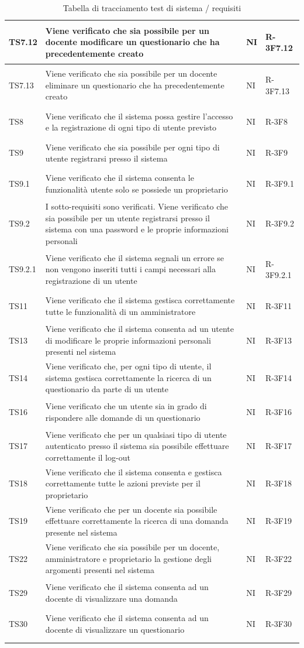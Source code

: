 \documentclass[12pt,a4paper]{article}
\begin{document}
\begin{longtable}{l p{6cm} l l}
		\midrule
		TS7.12 & Viene verificato che sia possibile per un docente modificare un questionario che ha precedentemente creato & NI& \hypertarget{R-3F7.12}{R-3F7.12}\tabularnewline
		\midrule
		TS7.13 & Viene verificato che sia possibile per un docente eliminare un questionario che ha precedentemente creato & NI& \hypertarget{R-3F7.13}{R-3F7.13}\tabularnewline
		\midrule
		TS8 & Viene verificato che il sistema possa gestire l'accesso e la registrazione di ogni tipo di utente previsto & NI& \hypertarget{R-3F8}{R-3F8}\tabularnewline
		\midrule
		TS9 & Viene verificato che sia possibile per ogni tipo di utente registrarsi presso il sistema & NI& \hypertarget{R-3F9}{R-3F9}\tabularnewline
		\midrule
		TS9.1 & Viene verificato che il sistema consenta le funzionalità utente solo se possiede un proprietario & NI& \hypertarget{R-3F9.1}{R-3F9.1}\tabularnewline
		\midrule
		TS9.2 & I sotto-requisiti sono verificati. Viene verificato che sia possibile per un utente registrarsi presso il sistema con una password e le proprie informazioni personali & NI& \hypertarget{R-3F9.2}{R-3F9.2}\tabularnewline
		\midrule
		TS9.2.1 & Viene verificato che il sistema segnali un errore se non vengono inseriti tutti i campi necessari alla registrazione di un utente & NI& \hypertarget{R-3F9.2.1}{R-3F9.2.1}\tabularnewline
		\midrule
		TS11 & Viene verificato che il sistema gestisca correttamente tutte le funzionalità di un amministratore & NI& \hypertarget{R-3F11}{R-3F11}\tabularnewline
		\midrule
		TS13 & Viene verificato che il sistema consenta ad un utente di modificare le proprie informazioni personali presenti nel sistema & NI& \hypertarget{R-3F13}{R-3F13}\tabularnewline
		\midrule
		TS14 & Viene verificato che, per ogni tipo di utente, il sistema gestisca correttamente la ricerca di un questionario da parte di un utente & NI& \hypertarget{R-3F14}{R-3F14}\tabularnewline
		\midrule
		TS16 & Viene verificato che un utente sia in grado di rispondere alle domande di un questionario & NI& \hypertarget{R-3F16}{R-3F16}\tabularnewline
		\midrule
		TS17 & Viene verificato che per un qualsiasi tipo di utente autenticato presso il sistema sia possibile effettuare correttamente il log-out  & NI& \hypertarget{R-3F17}{R-3F17}\tabularnewline
		\midrule
		TS18 & Viene verificato che il sistema consenta e gestisca correttamente tutte le azioni previste per il proprietario & NI& \hypertarget{R-3F18}{R-3F18}\tabularnewline
		\midrule
		TS19 & Viene verificato che per un docente sia possibile effettuare correttamente la ricerca di una domanda presente nel sistema & NI& \hypertarget{R-3F19}{R-3F19}\tabularnewline
		\midrule
		TS22 & Viene verificato che sia possibile per un docente, amministratore e proprietario la gestione degli argomenti presenti nel sistema & NI& \hypertarget{R-3F22}{R-3F22}\tabularnewline
		\midrule
		TS29 & Viene verificato che il sistema consenta ad un docente di visualizzare una domanda & NI& \hypertarget{R-3F29}{R-3F29}\tabularnewline
		\midrule
		TS30 & Viene verificato che il sistema consenta ad un docente di visualizzare un questionario & NI& \hypertarget{R-3F30}{R-3F30}\tabularnewline
		\midrule
		\caption{Tabella di tracciamento test di sistema / requisiti} \tabularnewline
	\end{longtable}
\end{document}
